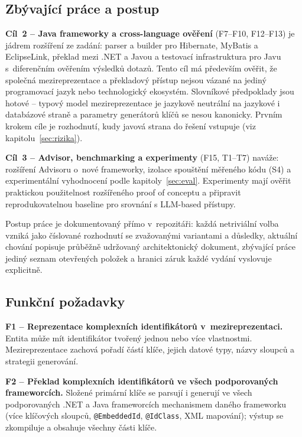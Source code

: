 \documentclass{article}
\begin{document}
\subsection{Zbývající práce a postup}

\textbf{Cíl~2 -- Java frameworky a cross-language ověření} (F7--F10, F12--F13) je jádrem rozšíření ze zadání: parser a builder pro Hibernate, MyBatis a EclipseLink, překlad mezi .NET a Javou a testovací infrastruktura pro Javu s~diferenčním ověřením výsledků dotazů. Tento cíl má především ověřit, že společná mezireprezentace a překladový přístup nejsou vázané na jediný programovací jazyk nebo technologický ekosystém. Slovníkové předpoklady jsou hotové -- typový model mezireprezentace je jazykově neutrální na jazykové i databázové straně a parametry generátorů klíčů se nesou kanonicky. Prvním krokem cíle je rozhodnutí, kudy javová strana do řešení vstupuje (viz kapitolu~\ref{sec:rizika}). 

\textbf{Cíl~3 -- Advisor, benchmarking a experimenty} (F15, T1--T7) naváže: rozšíření Advisoru o~nové frameworky, izolace spouštění měřeného kódu (S4) a experimentální vyhodnocení podle kapitoly~\ref{sec:eval}. Experimenty mají ověřit praktickou použitelnost rozšířeného proof of conceptu a připravit reprodukovatelnou baseline pro srovnání s LLM-based přístupy.

Postup práce je dokumentovaný přímo v~repozitáři: každá netriviální volba vzniká jako číslované rozhodnutí se zvažovanými variantami a důsledky, aktuální chování popisuje průběžně udržovaný architektonický dokument, zbývající práce jediný seznam otevřených položek a hranici záruk každé vydání vyslovuje explicitně.

\subsection{Funkční požadavky}

\textbf{F1 -- Reprezentace komplexních identifikátorů v~mezireprezentaci.} Entita může mít identifikátor tvořený jednou nebo více vlastnostmi. Mezireprezentace zachová pořadí částí klíče, jejich datové typy, názvy sloupců a strategii generování.

\textbf{F2 -- Překlad komplexních identifikátorů ve všech podporovaných frameworcích.} Složené primární klíče se parsují i generují ve všech podporovaných .NET a Java frameworcích mechanismem daného frameworku (více klíčových sloupců, \texttt{@EmbeddedId}, \texttt{@IdClass}, XML mapování); výstup se zkompiluje a obsahuje všechny části klíče.
\end{document}
